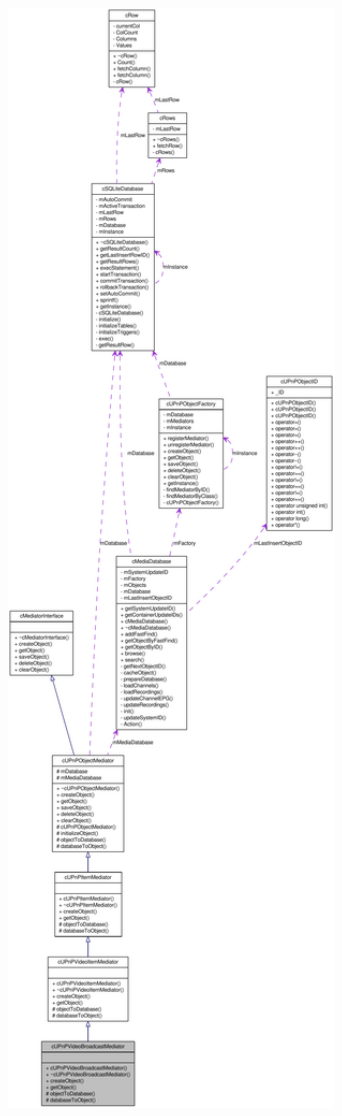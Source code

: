 \begin{figure}[H]
\begin{center}
\leavevmode
\includegraphics[width=400pt]{classcUPnPVideoBroadcastMediator__coll__graph}
\end{center}
\end{figure}
